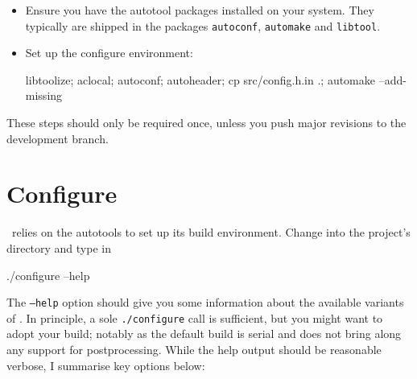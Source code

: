 \begin{itemize}
  \item Ensure you have the autotool packages installed on your system. They
  typically are shipped in the packages \texttt{autoconf}, \texttt{automake} and
  \texttt{libtool}.
  \item Set up the configure environment: 
 \begin{code}
 libtoolize; aclocal; autoconf; autoheader; 
 cp src/config.h.in .; 
 automake --add-missing
 \end{code}
\end{itemize}


\noindent
These steps should only be required once, unless you push major revisions to the
development branch.


\section{Configure}
\label{section:installation:configure}


\Peano\  relies on the autotools to set up its build environment.
Change into the project's directory and type in 
\begin{code}
./configure --help
\end{code}


The \texttt{--help} option should give you some information about the available
variants of \Peano.
In principle, a sole \texttt{./configure} call is sufficient, but you might want
to adopt your build; notably as the default build is serial and does not bring
along any support for postprocessing.
While the help output should be reasonable verbose, I summarise key options
below:

